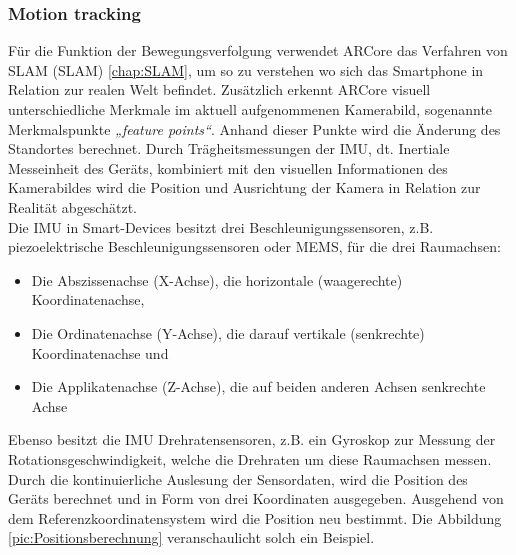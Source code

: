 \subsubsection*{Motion tracking}
Für die Funktion der Bewegungsverfolgung verwendet ARCore das Verfahren von \acl{SLAM} (\acs{SLAM}) \ref{chap:SLAM}, um so zu verstehen wo 
sich das Smartphone in Relation zur realen Welt befindet. Zusätzlich erkennt ARCore visuell unterschiedliche Merkmale im aktuell aufgenommenen 
Kamerabild, sogenannte Merkmalspunkte \textit{„feature points“}. Anhand dieser Punkte wird die Änderung des Standortes berechnet. Durch Trägheitsmessungen 
der \ac{IMU}, dt. Inertiale Messeinheit des Geräts, kombiniert mit den visuellen Informationen des Kamerabildes wird die Position und 
Ausrichtung der Kamera in Relation zur Realität abgeschätzt. 
\\
\linebreak 
Die \acl{IMU} in Smart-Devices besitzt drei Beschleunigungssensoren, z.B. piezoelektrische Beschleunigungssensoren oder \ac{MEMS}, für die 
drei Raumachsen:
\begin{itemize}
    \item Die Abszissenachse (X-Achse), die horizontale (waagerechte) Koordinatenachse,
    \item Die Ordinatenachse (Y-Achse), die darauf vertikale (senkrechte) Koordinatenachse und
    \item Die Applikatenachse (Z-Achse), die auf beiden anderen Achsen senkrechte Achse \cite{koordinatennorm.1973m}
\end{itemize}
Ebenso besitzt die \acs{IMU} Drehratensensoren, z.B. ein Gyroskop zur Messung der Rotationsgeschwindigkeit, welche die Drehraten um 
diese Raumachsen messen. Durch die kontinuierliche Auslesung der Sensordaten, wird die Position des Geräts berechnet und in Form von 
drei Koordinaten ausgegeben. Ausgehend von dem Referenzkoordinatensystem wird die Position neu bestimmt. Die Abbildung \ref{pic:Positionsberechnung} 
veranschaulicht solch ein Beispiel.

